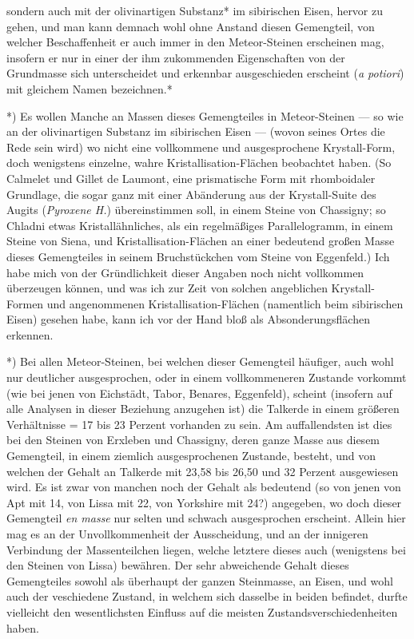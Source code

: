 \documentclass[a4paper, 11pt, oneside, german]{article}
\begin{document}
sondern auch mit der olivinartigen Substanz* im sibirischen Eisen, hervor zu gehen, und man kann demnach wohl ohne Anstand diesen Gemengteil, von welcher Beschaffenheit er auch immer in den Meteor-Steinen erscheinen mag, insofern er nur in einer der ihm zukommenden Eigenschaften von der Grundmasse sich unterscheidet und erkennbar ausgeschieden erscheint (\emph{a potiori}) mit gleichem Namen bezeichnen.*

*) Es wollen Manche an Massen dieses Gemengteiles in Meteor-Steinen --- so wie an der olivinartigen Substanz im sibirischen Eisen --- (wovon seines Ortes die Rede sein wird) wo nicht eine vollkommene und ausgesprochene Krystall-Form, doch wenigstens einzelne, wahre Kristallisation-Flächen beobachtet haben. (So Calmelet und Gillet de Laumont, eine prismatische Form mit rhomboidaler Grundlage, die sogar ganz mit einer Abänderung aus der Krystall-Suite des Augits (\emph{Pyroxene H.}) übereinstimmen soll, in einem Steine von Chassigny; so Chladni etwas Kristallähnliches, als ein regelmäßiges Parallelogramm, in einem Steine von Siena, und Kristallisation-Flächen an einer bedeutend großen Masse dieses Gemengteiles in seinem Bruchstückchen vom Steine von Eggenfeld.) Ich habe mich von der Gründlichkeit dieser Angaben noch nicht vollkommen überzeugen können, und was ich zur Zeit von solchen angeblichen Krystall-Formen und angenommenen Kristallisation-Flächen (namentlich beim sibirischen Eisen) gesehen habe, kann ich vor der Hand bloß als Absonderungsflächen erkennen.

*) Bei allen Meteor-Steinen, bei welchen dieser Gemengteil häufiger, auch wohl nur deutlicher ausgesprochen, oder in einem vollkommeneren Zustande vorkommt (wie bei jenen von Eichstädt, Tabor, Benares, Eggenfeld), scheint (insofern auf alle Analysen in dieser Beziehung anzugehen ist) die Talkerde in einem größeren Verhältnisse = 17 bis 23 Perzent vorhanden zu sein. Am auffallendsten ist dies bei den Steinen von Erxleben und Chassigny, deren ganze Masse aus diesem Gemengteil, in einem ziemlich ausgesprochenen Zustande, besteht, und von welchen der Gehalt an Talkerde mit 23,58 bis 26,50 und 32 Perzent ausgewiesen wird. Es ist zwar von manchen noch der Gehalt als bedeutend (so von jenen von Apt mit 14, von Lissa mit 22, von Yorkshire mit 24?) angegeben, wo doch dieser Gemengteil \emph{en masse} nur selten und schwach ausgesprochen erscheint. Allein hier mag es an der Unvollkommenheit der Ausscheidung, und an der innigeren Verbindung der Massenteilchen liegen, welche letztere dieses auch (wenigstens bei den Steinen von Lissa) bewähren. Der sehr abweichende Gehalt dieses Gemengteiles sowohl als überhaupt der ganzen Steinmasse, an Eisen, und wohl auch der veschiedene Zustand, in welchem sich dasselbe in beiden befindet, durfte vielleicht den wesentlichsten Einfluss auf die meisten Zustandsverschiedenheiten haben.
\end{document}
